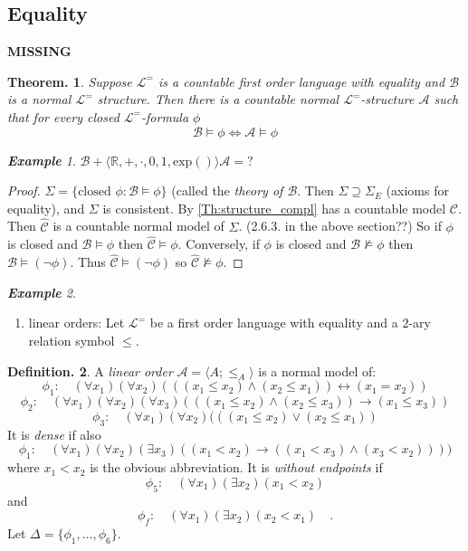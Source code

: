 \documentclass[a4paper,oneside,11pt,DIV=12,parskip=half]{scrartcl}
\newcommand{\R}{\mathbb R}
\newcommand{\LL}{\mathcal L}
\newcommand{\A}{\mathcal A}
\newcommand{\C}{\mathcal C}
\theoremstyle{plain}
\newtheorem{theorem}{Theorem.}[section]
\theoremstyle{definition}
\newtheorem{definition}[theorem]{Definition.}
\newtheorem{remark, definition}[theorem]{Remark and Definition.}
\newtheorem{lemma, definition}[theorem]{Lemma and Definition.}
\newtheorem{theorem, definition}[theorem]{Theorem and Definition.}
\theoremstyle{remark}
\newtheorem*{example}{\textbf{Example}}
\newtheorem*{remark, example}{\textbf{Remark and Exercise}}
\begin{document}
\subsection{Equality}
\textbf{MISSING}

\begin{theorem}\label{Th:Loewenheim_Skolem}
Suppose $\LL^=$ is a countable first order language with equality and $\mathcal{B}$ is a normal $\LL^=$ structure. Then there is a countable normal $\LL^=$-structure $\A$ such that for every closed $\LL^=$-formula $\phi$
    \[ \mathcal{B} \vDash \phi \Leftrightarrow \A \vDash \phi \]
\end{theorem}

\begin{example}
$\mathcal{B} + \langle \R, +, \cdot, 0, 1, \mathrm{exp}() \rangle
\A = ?
$
\end{example}

\begin{proof}
$\Sigma = \{ \text{closed } \phi : \mathcal{B} \vDash \phi \}$ (called the \emph{theory of $\mathcal{B}$}. Then $\Sigma \supseteq \Sigma_E$ (axioms for equality), and $\Sigma$ is consistent. By \ref{Th:structure_compl} has a countable model $\C$. Then $\hat{\C}$ is a countable normal model of $\Sigma$. (2.6.3. in the above section??)
So if $\phi$ is closed and $\mathcal{B} \vDash \phi$ then $\hat{\C} \vDash \phi$. Conversely, if $\phi$ is closed and $\mathcal{B} \not \vDash \phi$ then $\mathcal{B} \vDash (\lnot\phi)$. Thus $\hat{\C} \vDash (\lnot \phi)$ so $\hat{\C} \not \vDash \phi$.
\end{proof}

\begin{example}
\begin{enumerate}
    \item linear orders:
    Let $\LL^=$ be a first order language with equality and a $2$-ary relation symbol $\leq$.
\end{enumerate}
\end{example}

\begin{definition}
     A \emph{linear order} $\A = \langle A; \leq_A \rangle$ is a normal model of:
        \[ \phi_1: \quad (\forall x_1)(\forall x_2) (((x_1 \leq x_2) \land (x_2 \leq x_1)) \leftrightarrow (x_1 = x_2)) \]
        \[ \phi_2: \quad (\forall x_1)(\forall x_2)(\forall x_3) (((x_1 \leq x_2) \land (x_2 \leq x_3)) \rightarrow (x_1 \leq x_3)) \]
        \[ \phi_3: \quad (\forall x_1)(\forall x_2) (((x_1 \leq x_2) \lor (x_2 \leq x_1)) \]
    It is \emph{dense} if also
        \[ \phi_1: \quad (\forall x_1)(\forall x_2)(\exists x_3) ((x_1 < x_2) \rightarrow ((x_1 < x_3) \land (x_3 < x_2)))) \]
    where $x_1 < x_2$ is the obvious abbreviation.
    It is \emph{without endpoints} if 
        \[ \phi_5: \quad (\forall x_1)(\exists x_2) (x_1 < x_2) \]
    and
        \[ \phi_f: \quad (\forall x_1)(\exists x_2) (x_2 < x_1) \quad . \]
    Let $\Delta = \{\phi_1, \dots,\phi_6\}$.
\end{definition}
\end{document}
